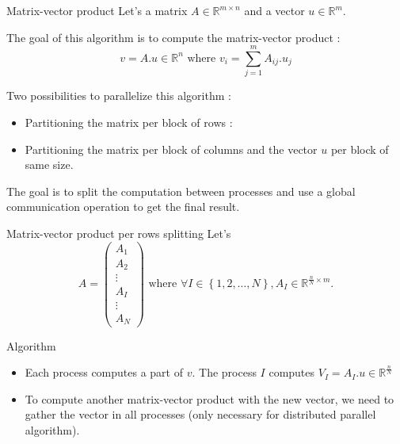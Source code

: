 \documentclass[compress,10pt,aspectratio=169]{beamer}
\begin{document}
\begin{frame}[fragile]{Matrix-vector product}
  \scriptsize
  Let's a matrix $A\in\mathbb{R}^{m\times n}$ and a vector $u\in\mathbb{R}^{m}$.

  The goal of this algorithm is to compute the matrix-vector product :
  \[
  v = A.u\in\mathbb{R}^{n}\mbox{ where } v_{i} = \sum_{j=1}^{m} A_{ij}.u_{j}
  \]
  
  Two possibilities to parallelize this algorithm :
  \begin{itemize}
  \item Partitioning the matrix per block of rows :
  \item Partitioning the matrix per block of columns and the vector $u$ per block of same size.
  \end{itemize}

  The goal is to split the computation between processes and use a global communication operation
  to get the final result.

\end{frame}

\begin{frame}[fragile]{Matrix-vector product per rows splitting}
  \scriptsize
  Let's
  \[
  A = \left(\begin{array}{c}
    A_{1} \\ \hline
    A_{2} \\ \hline
    \vdots \\ \hline
    A_{I} \\ \hline
    \vdots \\ \hline
    A_{N}
    \end{array}
  \right)
  \mbox{ where } \forall I\in\left\{1,2,\ldots,N\right\}, A_{I}\in\mathbb{R}^{\frac{n}{N}\times m}.
    \]

    \begin{exampleblock}{Algorithm}
      \begin{itemize}
      \item Each process computes a part of $v$. The process $I$ computes 
        $\displaystyle
        V_{I} = A_{I}.u \in \mathbb{R}^{\frac{n}{N}}
        $ 
      \item To compute another matrix-vector product with the new vector, we need to gather the vector
            in all processes (only necessary for distributed parallel algorithm).
      \end{itemize}
    \end{exampleblock}
  
\end{frame}
\end{document}
